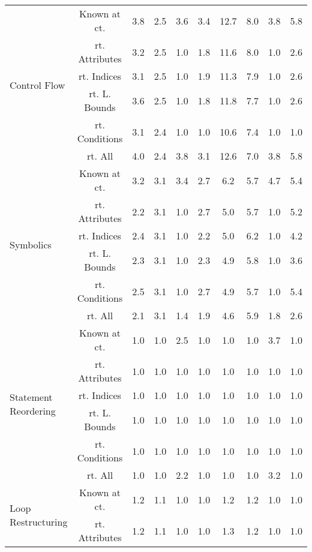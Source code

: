 \documentclass{article}
\begin{document}
\begin{longtable}{|p{2cm}||c|c|c|c|c|c|c|c|c|}
\hline
\multirow{6}{*}{ \parbox{2cm}{Control Flow}} & Known at ct. & 3.8 & 2.5 & 3.6 & 3.4 & 12.7 & 8.0 & 3.8 & 5.8\\ \cline{2-10}
 & rt. Attributes & 3.2 & 2.5 & 1.0 & 1.8 & 11.6 & 8.0 & 1.0 & 2.6\\ \cline{2-10}
 & rt. Indices & 3.1 & 2.5 & 1.0 & 1.9 & 11.3 & 7.9 & 1.0 & 2.6\\ \cline{2-10}
 & rt. L. Bounds & 3.6 & 2.5 & 1.0 & 1.8 & 11.8 & 7.7 & 1.0 & 2.6\\ \cline{2-10}
 & rt. Conditions & 3.1 & 2.4 & 1.0 & 1.0 & 10.6 & 7.4 & 1.0 & 1.0\\ \cline{2-10}
 & rt. All & 4.0 & 2.4 & 3.8 & 3.1 & 12.6 & 7.0 & 3.8 & 5.8\\ \cline{2-10}
\hline
\multirow{6}{*}{ \parbox{2cm}{Symbolics}} & Known at ct. & 3.2 & 3.1 & 3.4 & 2.7 & 6.2 & 5.7 & 4.7 & 5.4\\ \cline{2-10}
 & rt. Attributes & 2.2 & 3.1 & 1.0 & 2.7 & 5.0 & 5.7 & 1.0 & 5.2\\ \cline{2-10}
 & rt. Indices & 2.4 & 3.1 & 1.0 & 2.2 & 5.0 & 6.2 & 1.0 & 4.2\\ \cline{2-10}
 & rt. L. Bounds & 2.3 & 3.1 & 1.0 & 2.3 & 4.9 & 5.8 & 1.0 & 3.6\\ \cline{2-10}
 & rt. Conditions & 2.5 & 3.1 & 1.0 & 2.7 & 4.9 & 5.7 & 1.0 & 5.4\\ \cline{2-10}
 & rt. All & 2.1 & 3.1 & 1.4 & 1.9 & 4.6 & 5.9 & 1.8 & 2.6\\ \cline{2-10}
\hline
\multirow{6}{*}{ \parbox{2cm}{Statement Reordering}} & Known at ct. & 1.0 & 1.0 & 2.5 & 1.0 & 1.0 & 1.0 & 3.7 & 1.0\\ \cline{2-10}
 & rt. Attributes & 1.0 & 1.0 & 1.0 & 1.0 & 1.0 & 1.0 & 1.0 & 1.0\\ \cline{2-10}
 & rt. Indices & 1.0 & 1.0 & 1.0 & 1.0 & 1.0 & 1.0 & 1.0 & 1.0\\ \cline{2-10}
 & rt. L. Bounds & 1.0 & 1.0 & 1.0 & 1.0 & 1.0 & 1.0 & 1.0 & 1.0\\ \cline{2-10}
 & rt. Conditions & 1.0 & 1.0 & 1.0 & 1.0 & 1.0 & 1.0 & 1.0 & 1.0\\ \cline{2-10}
 & rt. All & 1.0 & 1.0 & 2.2 & 1.0 & 1.0 & 1.0 & 3.2 & 1.0\\ \cline{2-10}
\hline
\multirow{6}{*}{ \parbox{2cm}{Loop Restructuring}} & Known at ct. & 1.2 & 1.1 & 1.0 & 1.0 & 1.2 & 1.2 & 1.0 & 1.0\\ \cline{2-10}
 & rt. Attributes & 1.2 & 1.1 & 1.0 & 1.0 & 1.3 & 1.2 & 1.0 & 1.0\\ \cline{2-10}

\end{longtable}
\end{document}
